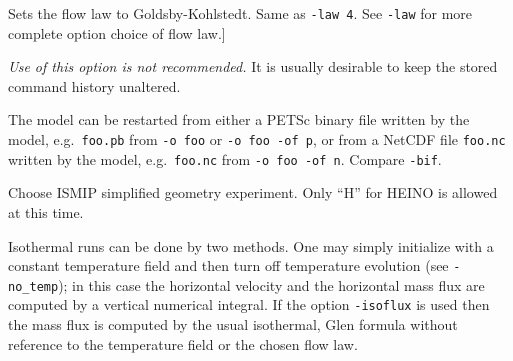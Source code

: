\documentclass[11pt,final]{amsart}
\begin{document}
  Sets the flow law to Goldsby-Kohlstedt.  Same as \verb|-law 4|.  See \verb|-law| for more complete option choice of flow law.]

  \emph{Use of this option is not recommended.}  It is usually desirable to keep the stored command history unaltered.


  The model can be restarted from either a PETSc binary file written by the model, e.g.~\verb|foo.pb| from \verb|-o foo| or \verb|-o foo -of p|, or from a NetCDF file \verb|foo.nc| written by the model, e.g.~\verb|foo.nc| from \verb|-o foo -of n|.  Compare \verb|-bif|.

  Choose ISMIP simplified geometry experiment.  Only ``H'' for HEINO is allowed at this time.

  Isothermal runs can be done by two methods.  One may simply initialize with a constant temperature field and then turn off temperature evolution (see \verb|-no_temp|); in this case the horizontal velocity and the horizontal mass flux are computed by a vertical numerical integral.  If the option \verb|-isoflux| is used then the mass flux is computed by the usual isothermal, Glen formula without reference to the temperature field or the chosen flow law.


\end{document}
